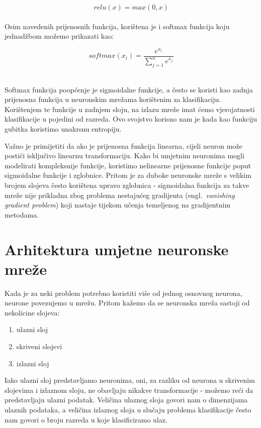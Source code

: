 \documentclass[times, utf8, zavrsni, numeric]{fer}
\begin{document}
\begin{equation}
    relu(x) = max(0, x)
    \label{eq:relu}
\end{equation}
\\
Osim navedenih prijenosnih funkcija, korištena je i softmax funkcija koju jednadžbom možemo prikazati kao:

\begin{equation}
    softmax(x_{i}) = \frac{e^{x_{i}}}{\sum_{j=1}^{n}e^{x_{j}}}
    \label{eq:softmax}
\end{equation}
\\
\pagebreak

Softmax funkcija poopćenje je sigmoidalne funkcije, a često se koristi kao zadnja prijenosna funkcija u neuronskim mrežama korištenim za klasifikaciju.
Korištenjem te funkcije u zadnjem sloju, na izlazu mreže imat ćemo vjerojatnosti klasifikacije u pojedini od razreda. Ovo svojstvo korisno nam je kada kao funkciju gubitka koristimo unakrsnu entropiju.

Važno je primijetiti da ako je prijenosna funkcija linearna, cijeli neuron može postići isključivo linearnu transformaciju. 
Kako bi umjetnim neuronima mogli modelirati kompleksnije funkcije, koristimo nelinearne prijenosne funkcije poput sigmoidalne funkcije i zglobnice. 
Pritom je za duboke neuronske mreže s velikim brojem slojeva često korištena upravo zglobnica - 
sigmoidalna funkcija za takve mreže nije prikladna zbog problema nestajućeg gradijenta (engl.\ \textit{vanishing gradient problem}) koji nastaje tijekom učenja temeljenog na gradijentnim metodama.

\section{Arhitektura umjetne neuronske mreže}
Kada je za neki problem potrebno koristiti više od jednog osnovnog neurona, neurone povezujemo u mrežu. Pritom kažemo da se neuronska mreža sastoji od nekolicine slojeva:
\begin{enumerate}
    \item ulazni sloj
    \item skriveni slojevi
    \item izlazni sloj
\end{enumerate}
Iako ulazni sloj predstavljamo neuronima, oni, za razliku od neurona u skrivenim slojevima i izlaznom sloju, ne obavljaju nikakve transformacije - možemo reći da predstavljaju ulazni podatak.
Veličina ulaznog sloja govori nam o dimenzijama ulaznih podataka, a veličina izlaznog sloja u slučaju problema klasifikacije često nam govori o broju razreda u koje klasificiramo ulaz. 
\end{document}
